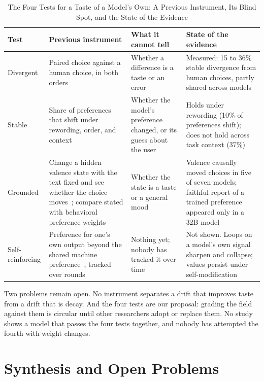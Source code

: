 \documentclass[journal]{IEEEtran}
\begin{document}
\begin{table}[!t]
\caption{The Four Tests for a Taste of a Model's Own: A Previous Instrument, Its Blind Spot, and the State of the Evidence}\label{tab:5}
\centering\footnotesize\renewcommand{\arraystretch}{1.15}
\begin{tabularx}{\textwidth}{@{}l>{\raggedright\arraybackslash}X>{\raggedright\arraybackslash}p{}>{\raggedright\arraybackslash}X@{}}
\toprule
\textbf{Test} & \textbf{Previous instrument} & \textbf{What it cannot tell} & \textbf{State of the evidence} \\
\midrule
Divergent & Paired choice against a human choice, in both orders~\cite{Trehan2026} & Whether a difference is a taste or an error & Measured: 15 to 36\% stable divergence from human choices, partly shared across models \\
Stable & Share of preferences that shift under rewording, order, and context~\cite{Trhlik2026} & Whether the model's preference changed, or its guess about the user & Holds under rewording (10\% of preferences shift); does not hold across task context (37\%) \\
Grounded & Change a hidden valence state with the text fixed and see whether the choice moves~\cite{Berg2026}; compare stated with behavioral preference weights~\cite{Atkinson2026} & Whether the state is a taste or a general mood & Valence causally moved choices in five of seven models; faithful report of a trained preference appeared only in a 32B model \\
Self-reinforcing & Preference for one's own output beyond the shared machine preference~\cite{Zatuchin2026}, tracked over rounds & Nothing yet; nobody has tracked it over time & Not shown. Loops on a model's own signal sharpen and collapse; values persist under self-modification \\
\bottomrule
\end{tabularx}
\end{table}


Two problems remain open. No instrument separates a drift that improves taste from a drift that is decay. And the four tests are our proposal: grading the field against them is circular until other researchers adopt or replace them. No study shows a model that passes the four tests together, and nobody has attempted the fourth with weight changes.

\section{Synthesis and Open Problems}\label{sec:9}
\end{document}
